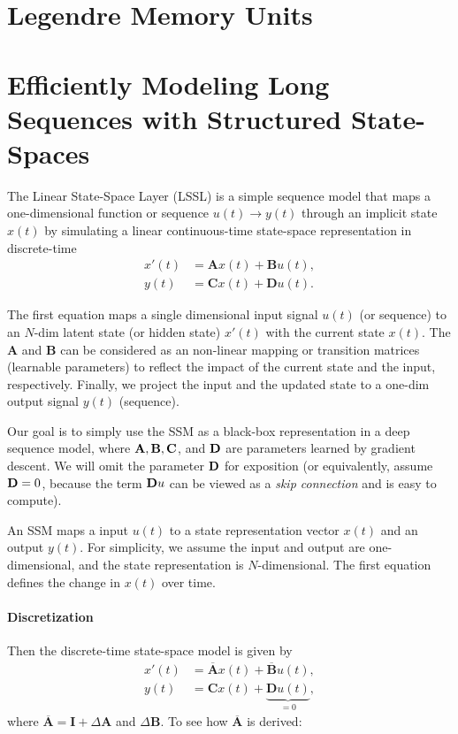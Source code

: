 \section{Legendre Memory Units}
\label{sec:nlp_lmu}


\section{Efficiently Modeling Long Sequences with Structured State-Spaces}
\label{sec:nlp_ssm}
The Linear State-Space Layer (LSSL) is a simple sequence model that maps a one-dimensional function  or sequence $u(t)\to y(t)$ through an implicit state $x(t)$ by simulating a linear continuous-time state-space representation in discrete-time
\begin{align*}
	x'(t) &= \mathbf{A}x(t)+\mathbf{B}u(t),\\
	y(t) &= \mathbf{C}x(t)+\mathbf{D}u(t).
\end{align*}

The first equation maps a single dimensional input signal $u(t)$ (or sequence) to an $N$-dim latent state (or hidden state) $x'(t)$ with the current state $x(t)$. The $\mathbf{A}$ and $\mathbf{B}$ can be considered as an non-linear mapping or transition matrices (\ie learnable parameters) to reflect the impact of the current state and the input, respectively. Finally, we project the input and the updated state to a one-dim output signal $y(t)$ (\ie sequence).  

Our goal is to simply use the SSM as a black-box representation in a deep sequence model, where ${\mathbf{A}}, {\mathbf{B}}, {\mathbf{C}}$, and ${\mathbf{D}}$ are parameters learned by gradient descent. We will omit the parameter ${\mathbf{D}}$ for exposition (or equivalently, assume ${\mathbf{D}}=0$, because the term ${\mathbf{D}} u$ can be viewed as a \textit{skip connection} and is easy to compute).

An SSM maps a input $u(t)$ to a state representation vector $x(t)$ and an output $y(t)$. For simplicity, we assume the input and output are one-dimensional, and the state representation is $N$-dimensional. The first equation defines the change in $x(t)$ over time.

\paragraph{Discretization} Then the discrete-time state-space model is given by
\begin{align*}
	x'(t) &= \overline{\mathbf{A}}x(t)+\overline{\mathbf{B}}u(t),\\
	y(t) &= \mathbf{C}x(t)+\underbrace{\mathbf{D}u(t)}_{=0},
\end{align*}
where $\overline{\mathbf{A}} = \mathbf{I}+\Delta \mathbf{A}$ and $\Delta \mathbf{B}$. To see how $\overline{\mathbf{A}}$ is derived:

